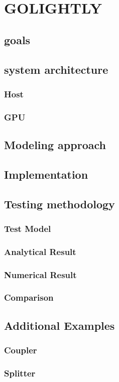 \chapter{GOLIGHTLY} \label{ch:golightly}


\section{goals}
\section{system architecture}
\subsection{Host}
\subsection{GPU}
\section{Modeling approach}
\section{Implementation}
\section{Testing methodology}
\subsection{Test Model}
\subsection{Analytical Result}
\subsection{Numerical Result}
\subsection{Comparison}
\section{Additional Examples}
\subsection{Coupler}
\subsection{Splitter}

